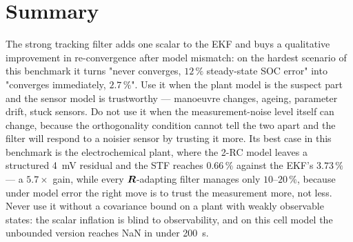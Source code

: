 \section{Summary}
The strong tracking filter adds one scalar to the EKF and buys a qualitative improvement in
re-convergence after model mismatch: on the hardest scenario of this benchmark it turns "never
converges, $12\,\%$ steady-state SOC error" into "converges immediately, $2.7\,\%$".  Use it when the
plant model is the suspect part and the sensor model is trustworthy --- manoeuvre changes, ageing,
parameter drift, stuck sensors.  Do not use it when the measurement-noise level itself can change,
because the orthogonality condition cannot tell the two apart and the filter will respond to a
noisier sensor by trusting it more.  Its best case in this benchmark is the electrochemical plant, where the 2-RC model leaves a
structured \SI{4}{\milli\volt} residual and the STF reaches $0.66\,\%$ against the EKF's
$3.73\,\%$ --- a $5.7\times$ gain, while every $\bm{R}$-adapting filter manages only $10$--$20\,\%$,
because under model error the right move is to trust the measurement more, not less.  Never use it
without a covariance bound on a plant with weakly observable states: the scalar inflation is blind to
observability, and on this cell model the unbounded version reaches NaN in under \SI{200}{\second}.
